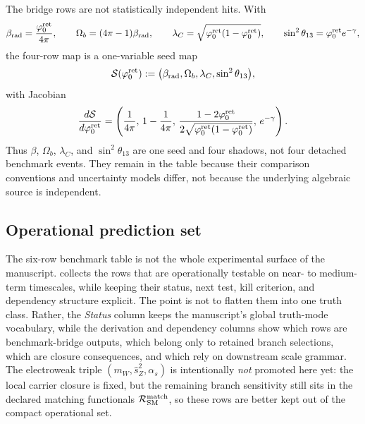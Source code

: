 \begin{remark}
The bridge rows are not statistically independent hits. With
\[
\beta_{\mathrm{rad}}=\frac{\varphi_0^{\mathrm{ret}}}{4\pi},
\qquad
\Omega_b=(4\pi-1)\beta_{\mathrm{rad}},
\qquad
\lambda_C=\sqrt{\varphi_0^{\mathrm{ret}}(1-\varphi_0^{\mathrm{ret}})},
\qquad
\sin^2\theta_{13}=\varphi_0^{\mathrm{ret}} e^{-\gamma},
\]
the four-row map is a one-variable seed map
\[
\mathcal S(\varphi_0^{\mathrm{ret}}):=\bigl(\beta_{\mathrm{rad}},\Omega_b,\lambda_C,\sin^2\theta_{13}\bigr),
\]
with Jacobian
\[
\frac{d\mathcal S}{d\varphi_0^{\mathrm{ret}}}
=
\left(
\frac{1}{4\pi},
\,
1-\frac{1}{4\pi},
\,
\frac{1-2\varphi_0^{\mathrm{ret}}}{2\sqrt{\varphi_0^{\mathrm{ret}}(1-\varphi_0^{\mathrm{ret}})}},
\,
e^{-\gamma}
\right).
\]
Thus $\beta$, $\Omega_b$, $\lambda_C$, and $\sin^2\theta_{13}$ are one seed and four shadows, not four detached benchmark events. They remain in the table because their comparison conventions and uncertainty models differ, not because the underlying algebraic source is independent.
\end{remark}

\subsection{Operational prediction set}

The six-row benchmark table is not the whole experimental surface of the manuscript.  collects the rows that are operationally testable on near- to medium-term timescales, while keeping their status, next test, kill criterion, and dependency structure explicit. The point is not to flatten them into one truth class. Rather, the \emph{Status} column keeps the manuscript's global truth-mode vocabulary, while the derivation and dependency columns show which rows are benchmark-bridge outputs, which belong only to retained branch selections, which are closure consequences, and which rely on downstream scale grammar. The electroweak triple $(m_W,\hat s_Z^2,\alpha_s)$ is intentionally \emph{not} promoted here yet: the local carrier closure is fixed, but the remaining branch sensitivity still sits in the declared matching functionals $\mathcal R_{\mathrm{SM}}^{\mathrm{match}}$, so these rows are better kept out of the compact operational set.

